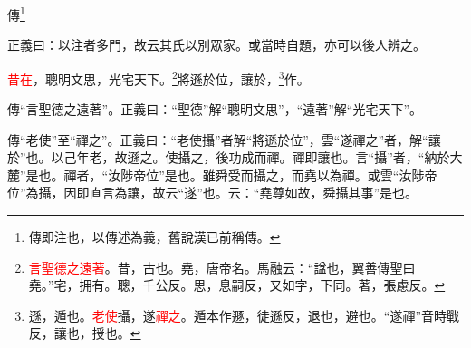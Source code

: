 傳\footnote{傳即注也，以傳述為義，舊說漢已前稱傳。}

{\noindent\shu{}\fzkt 正義曰：以注者多門，故云其氏以別眾家。或當時自題，亦可以後人辨之。 \par}

\textcolor{red}{昔在}，聰明文思，光宅天下。\footnote{\textcolor{red}{言聖德之遠著}。昔，古也。堯，唐帝名。馬融云：“諡也，翼善傳聖曰堯。”宅，拥有。聰，千公反。思，息嗣反，又如字，下同。著，張慮反。}將遜於位，讓於，\footnote{遜，遁也。\textcolor{red}{老使}攝，遂\textcolor{red}{禪之}。遁本作遯，徒遜反，退也，避也。“遂禪”音時戰反，讓也，授也。}作\CJKunderwave{\textcolor{red}{堯典}}。

{\noindent\zhuan{}\fzbyks 傳“言聖德之遠著”。正義曰：“聖德”解“聰明文思”，“遠著”解“光宅天下”。 \par}

{\noindent\zhuan{}\fzbyks 傳“老使”至“禪之”。正義曰：“老使攝”者解“將遜於位”，雲“遂禪之”者，解“讓於”也。以己年老，故遜之。使攝之，後功成而禪。禪即讓也。言“攝”者，“納於大麓”是也。禪者，“汝陟帝位”是也。雖舜受而攝之，而堯以為禪。或雲“汝陟帝位”為攝，因即直言為讓，故云“遂”也。云：“堯尊如故，舜攝其事”是也。 \par}

